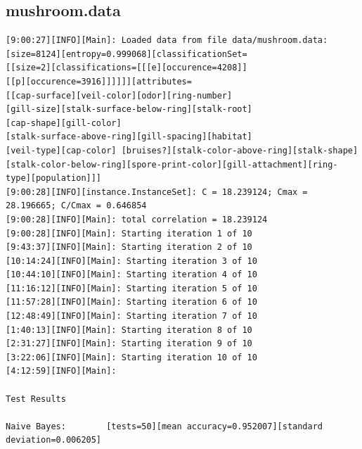 \documentclass[10pt]{report}
\begin{document}
\subsection*{mushroom.data}
{\small
\begin{verbatim}
[9:00:27][INFO][Main]: Loaded data from file data/mushroom.data:
[size=8124][entropy=0.999068][classificationSet=
[[size=2][classifications=[[[e][occurence=4208]]
[[p][occurence=3916]]]]]][attributes=
[[cap-surface][veil-color][odor][ring-number]
[gill-size][stalk-surface-below-ring][stalk-root]
[cap-shape][gill-color]
[stalk-surface-above-ring][gill-spacing][habitat]
[veil-type][cap-color] [bruises?][stalk-color-above-ring][stalk-shape]
[stalk-color-below-ring][spore-print-color][gill-attachment][ring-type][population]]] 
[9:00:28][INFO][instance.InstanceSet]: C = 18.239124; Cmax = 28.196665; C/Cmax = 0.646854 
[9:00:28][INFO][Main]: total correlation = 18.239124 
[9:00:28][INFO][Main]: Starting iteration 1 of 10 
[9:43:37][INFO][Main]: Starting iteration 2 of 10 
[10:14:24][INFO][Main]: Starting iteration 3 of 10 
[10:44:10][INFO][Main]: Starting iteration 4 of 10 
[11:16:12][INFO][Main]: Starting iteration 5 of 10 
[11:57:28][INFO][Main]: Starting iteration 6 of 10 
[12:48:49][INFO][Main]: Starting iteration 7 of 10 
[1:40:13][INFO][Main]: Starting iteration 8 of 10 
[2:31:27][INFO][Main]: Starting iteration 9 of 10 
[3:22:06][INFO][Main]: Starting iteration 10 of 10 
[4:12:59][INFO][Main]:

Test Results

Naive Bayes:		[tests=50][mean accuracy=0.952007][standard deviation=0.006205] 
\end{verbatim}
}
\end{document}
